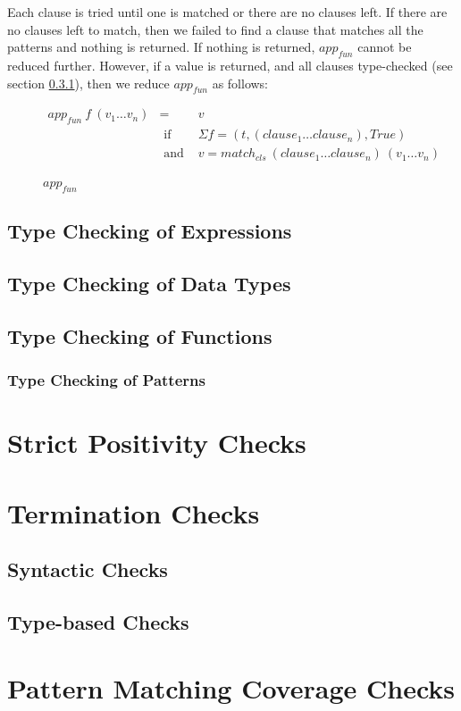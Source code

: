 \documentclass[acmsmall]{acmart}
\begin{document}
Each clause is tried until one is matched or there are no clauses left. If there are no clauses left to match, then we failed to find a clause that matches all the patterns and nothing is returned. If nothing is returned, $app_{fun}$ cannot be reduced further. However, if a value is returned, and all clauses type-checked (see section \ref{sec:typeCheckPattern}), then we reduce $app_{fun}$ as follows:

\begin{figure}[H]
  \begin{equation*}
    \begin{aligned}
      app_{fun} \: f \: (v_1 \dots v_n) & =              & v                                                               \\
                                        & \textrm{ if }  & \Sigma f = (t, (clause_1 \dots clause_n), True)                 \\
                                        & \textrm{ and } & v = match_{cls} \: (clause_1 \dots clause_n) \: (v_1 \dots v_n) \\
    \end{aligned}
  \end{equation*}
  \caption{$app_{fun}$}
\end{figure}

\subsection{Type Checking of Expressions}

\subsection{Type Checking of Data Types}

\subsection{Type Checking of Functions}

\subsubsection{Type Checking of Patterns}
\label{sec:typeCheckPattern}

\section{Strict Positivity Checks}
\label{sec:spos}

\section{Termination Checks}
\label{sec:termination}

\subsection{Syntactic Checks}

\subsection{Type-based Checks}

\section{Pattern Matching Coverage Checks}
\label{sec:pattern}
\end{document}
